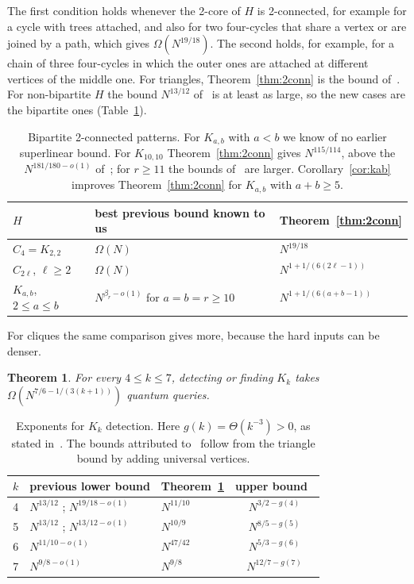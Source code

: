 \documentclass[11pt]{article}
\newtheorem{theorem}{Theorem}[section]
\theoremstyle{remark}
\begin{document}
The first condition holds whenever the 2-core of $H$ is 2-connected, for example for a cycle with trees attached, and also for two four-cycles that share a vertex or are joined by a path, which gives $\Omega(N^{19/18})$. The second holds, for example, for a chain of three four-cycles in which the outer ones are attached at different vertices of the middle one. For triangles, Theorem~\ref{thm:2conn} is the bound of~\cite{CGZ26}. For non-bipartite $H$ the bound $N^{13/12}$ of~\cite{CGZ26} is at least as large, so the new cases are the bipartite ones (Table~\ref{tab:bip}).

\begin{table}[h]
\centering
\renewcommand{\arraystretch}{1.2}
\begin{tabular}{@{}lll@{}}
\toprule
$H$ & best previous bound known to us & Theorem~\ref{thm:2conn}\\
\midrule
$C_4=K_{2,2}$ & $\Omega(N)$ & $N^{19/18}$\\
$C_{2\ell}$, $\ell\ge2$ & $\Omega(N)$ & $N^{1+1/(6(2\ell-1))}$\\
$K_{a,b}$, $2\le a\le b$ & $N^{\beta_r-o(1)}$ for $a=b=r\ge10$~\cite{GZ26} & $N^{1+1/(6(a+b-1))}$\\
\bottomrule
\end{tabular}
\caption{Bipartite 2-connected patterns. For $K_{a,b}$ with $a<b$ we know of no earlier superlinear bound. For $K_{10,10}$ Theorem~\ref{thm:2conn} gives $N^{115/114}$, above the $N^{181/180-o(1)}$ of~\cite{GZ26}; for $r\ge11$ the bounds of~\cite{GZ26} are larger. Corollary~\ref{cor:kab} improves Theorem~\ref{thm:2conn} for $K_{a,b}$ with $a+b\ge5$.}
\label{tab:bip}
\end{table}

For cliques the same comparison gives more, because the hard inputs can be denser.

\begin{theorem}\label{thm:clique}
For every $4\le k\le7$, detecting or finding $K_k$ takes $\Omega(N^{7/6-1/(3(k+1))})$ quantum queries.
\end{theorem}

\begin{table}[h]
\centering
\renewcommand{\arraystretch}{1.2}
\begin{tabular}{@{}cllc@{}}
\toprule
$k$ & previous lower bound & Theorem~\ref{thm:clique} & upper bound~\cite{LMS12,Zhu12}\\
\midrule
4 & $N^{13/12}$ \cite{CGZ26}; $N^{19/18-o(1)}$ \cite{GZ26} & $N^{11/10}$ & $N^{3/2-g(4)}$\\
5 & $N^{13/12}$ \cite{CGZ26}; $N^{13/12-o(1)}$ \cite{GZ26} & $N^{10/9}$ & $N^{8/5-g(5)}$\\
6 & $N^{11/10-o(1)}$ \cite{GZ26} & $N^{47/42}$ & $N^{5/3-g(6)}$\\
7 & $N^{9/8-o(1)}$ \cite{GZ26} & $N^{9/8}$ & $N^{12/7-g(7)}$\\
\bottomrule
\end{tabular}
\caption{Exponents for $K_k$ detection. Here $g(k)=\Theta(k^{-3})>0$, as stated in~\cite{GZ26}. The bounds attributed to~\cite{CGZ26} follow from the triangle bound by adding universal vertices.}
\label{tab:clique}
\end{table}
\end{document}
